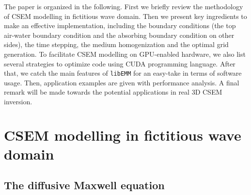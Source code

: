 \documentclass[a4paper,10pt]{article}
\begin{document}
The paper is organized in the following. First we briefly review the methodology of CSEM modelling in fictitious wave domain. Then we present key ingredients to make an effective implementation, including the boundary conditions (the top air-water boundary condition and the absorbing boundary condition on other sides), the time stepping, the medium homogenization and the optimal grid generation.
To facilitate CSEM modelling on GPU-enabled hardware, we also list several strategies  to optimize code using CUDA programming language. After that, we catch the main features of \verb|libEMM| for an easy-take in terms of software usage. Then, application examples are given with performance analysis. A final remark will be made towards the potential applications in real 3D CSEM inversion.

\section{CSEM modelling in fictitious wave domain}

\subsection{The diffusive Maxwell equation}
\end{document}
